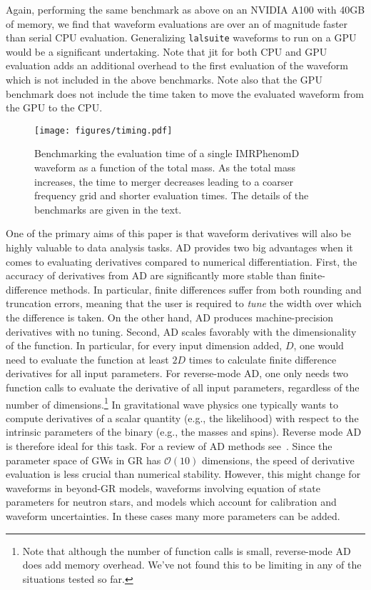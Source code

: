 \documentclass[twocolumn]{aastex631}
\newcommand{\lalsuite}{\texttt{lalsuite}\xspace}
\begin{document}
Again, performing the same benchmark as above on an NVIDIA A100 with 40GB of memory, we find that waveform evaluations are over an of magnitude faster than serial CPU evaluation.
Generalizing \lalsuite waveforms to run on a GPU would be a significant undertaking.
Note that jit for both CPU and GPU evaluation adds an additional overhead to the first evaluation of the waveform which is not included in the above benchmarks. 
Note also that the GPU benchmark does not include the time taken to move the evaluated waveform from the GPU to the CPU.

\begin{figure}[t]
	\begin{centering}
		\texttt{[image: figures/timing.pdf]}
		\caption{
			Benchmarking the evaluation time of a single IMRPhenomD waveform as a function of the total mass. As the total mass increases, the time to merger decreases leading to a coarser frequency grid and shorter evaluation times. The details of the benchmarks are given in the text.
        }
		\label{fig:timing}
	\end{centering}
\end{figure}

One of the primary aims of this paper is that waveform derivatives will also be highly valuable to data analysis tasks. 
AD provides two big advantages when it comes to evaluating derivatives compared to numerical differentiation.
First, the accuracy of derivatives from AD are significantly more stable than finite-difference methods.
In particular, finite differences suffer from both rounding and truncation errors, meaning that the user is required to \textit{tune} the width over which the difference is taken.
On the other hand, AD produces machine-precision derivatives with no tuning.
Second, AD scales favorably with the dimensionality of the function.
In particular, for every input dimension added, $D$, one would need to evaluate the function at least $2D$ times to calculate finite difference derivatives for all input parameters.
For reverse-mode AD, one only needs two function calls to evaluate the derivative of all input parameters, regardless of the number of dimensions.\footnote{
    Note that although the number of function calls is small, reverse-mode AD does add memory overhead.
    We've not found this to be limiting in any of the situations tested so far.
}
In gravitational wave physics one typically wants to compute derivatives of a scalar quantity (e.g., the likelihood) with respect to the intrinsic parameters of the binary (e.g., the masses and spins).
Reverse mode AD is therefore ideal for this task.
For a review of AD methods see~\cite{2018arXiv181105031M}.
Since the parameter space of GWs in GR has $\mathcal{O}(10)$ dimensions, the speed of derivative evaluation is less crucial than numerical stability.
However, this might change for waveforms in beyond-GR models, waveforms involving equation of state parameters for neutron stars, and models which account for calibration and waveform uncertainties.
In these cases many more parameters can be added.
\end{document}
